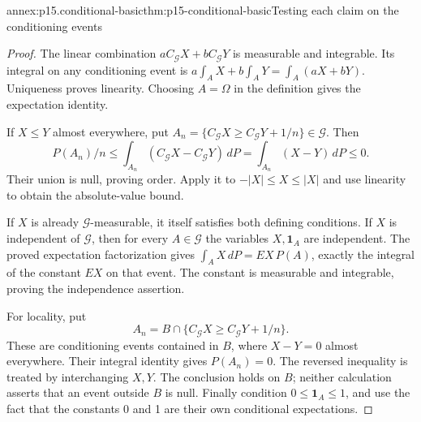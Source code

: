\begin{annexitem}{annex:p15.conditional-basic}{thm:p15-conditional-basic}{Testing each claim on the conditioning events}
\begin{proof}
The linear combination \(aC_{\mathcal G}X+bC_{\mathcal G}Y\)
is measurable and integrable. Its integral on any conditioning event
is \(a\int_AX+b\int_AY=\int_A(aX+bY)\).
Uniqueness proves linearity.
Choosing \(A=\Omega\) in the definition gives the expectation identity.

If \(X\leq Y\) almost everywhere, put
\(A_n=\{C_{\mathcal G}X\geq C_{\mathcal G}Y+1/n\}\in\mathcal G\).
Then
\[
       P(A_n)/n\leq\int_{A_n}(C_{\mathcal G}X-C_{\mathcal G}Y)\,dP
                            =\int_{A_n}(X-Y)\,dP\leq0.
\]
Their union is null, proving order. Apply it to
\(-|X|\leq X\leq|X|\) and use linearity to obtain the absolute-value bound.

If \(X\) is already \(\mathcal G\)-measurable, it itself satisfies
both defining conditions. If \(X\) is independent of \(\mathcal G\),
then for every \(A\in\mathcal G\) the variables \(X,\mathbf1_A\)
are independent. The proved expectation factorization gives
\(\int_AX\,dP=EX\,P(A)\), exactly the integral of the constant \(EX\)
on that event. The constant is measurable and integrable, proving the
independence assertion.

For locality, put
\[
 A_n=B\cap\{C_{\mathcal G}X\geq C_{\mathcal G}Y+1/n\}.
\]
These are conditioning events contained in \(B\), where \(X-Y=0\)
almost everywhere. Their integral identity gives \(P(A_n)=0\).
The reversed inequality is treated by interchanging \(X,Y\).
The conclusion holds on \(B\); neither calculation asserts that an
event outside \(B\) is null.
Finally condition \(0\leq\mathbf1_A\leq1\), and use the fact that
the constants 0 and 1 are their own conditional expectations.
\end{proof}
\end{annexitem}

